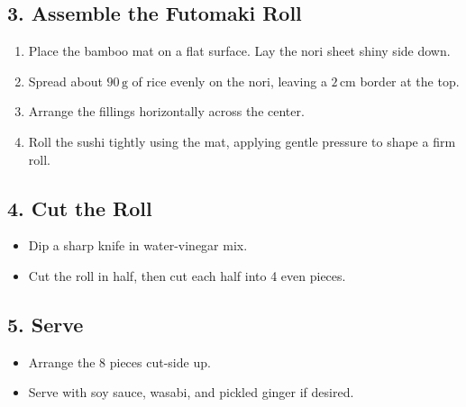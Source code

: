 \documentclass[landscape, a4paper]{article}
\newcommand\alert[1]{\textcolor{PrimaryColor}{\textbf{#1}}}
\begin{document}
\begin{minipage}[t]{0.31\textwidth}
\begin{itemize}
	\end{itemize}

	\subsection*{3. Assemble the Futomaki Roll}
	\begin{enumerate}
		\item Place the bamboo mat on a flat surface. Lay the nori sheet shiny side down.
		\item Spread about \(90\,\mathrm{g}\) of rice evenly on the nori, leaving a \(2\,\mathrm{cm}\) border at the top.
		\item Arrange the fillings horizontally across the center.
		\item Roll the sushi tightly using the mat, applying gentle pressure to shape a firm roll.
	\end{enumerate}

	\subsection*{4. Cut the Roll}
	\begin{itemize}
		\item Dip a sharp knife in water-vinegar mix.
		\item Cut the roll in half, then cut each half into 4 even pieces.
	\end{itemize}

	\subsection*{5. Serve}
	\begin{itemize}
		\item Arrange the 8 pieces cut-side up.
		\item Serve with soy sauce, wasabi, and pickled ginger if desired.
	\end{itemize}

\end{minipage}%
\end{document}
